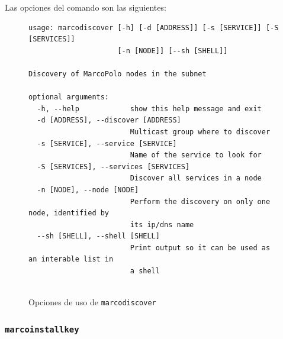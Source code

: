 Las opciones del comando son las siguientes:

\begin{figure}[H]
\centering



\begin{lstlisting}
usage: marcodiscover [-h] [-d [ADDRESS]] [-s [SERVICE]] [-S [SERVICES]]
                     [-n [NODE]] [--sh [SHELL]]

Discovery of MarcoPolo nodes in the subnet

optional arguments:
  -h, --help            show this help message and exit
  -d [ADDRESS], --discover [ADDRESS]
                        Multicast group where to discover
  -s [SERVICE], --service [SERVICE]
                        Name of the service to look for
  -S [SERVICES], --services [SERVICES]
                        Discover all services in a node
  -n [NODE], --node [NODE]
                        Perform the discovery on only one node, identified by
                        its ip/dns name
  --sh [SHELL], --shell [SHELL]
                        Print output so it can be used as an interable list in
                        a shell


\end{lstlisting}
\caption{Opciones de uso de \texttt{marcodiscover}}
\label{fig:marcodiscover_help}
\end{figure}

\subsubsection{\texttt{marcoinstallkey}}
\label{marcoinstallkey}

